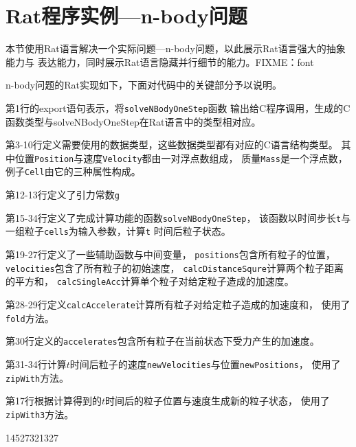 \section{Rat程序实例---n-body问题}\label{sec:n-body}
本节使用Rat语言解决一个实际问题---n-body问题，以此展示Rat语言强大的抽象能力与
表达能力，同时展示Rat语言隐藏并行细节的能力。FIXME：font
\begin{quotation}
\end{quotation}

n-body问题的Rat实现如下，下面对代码中的关键部分予以说明。
\begin{compactitem}
  \item 第1行的export语句表示，将\texttt{solveNBodyOneStep}函数
    输出给C程序调用，生成的C函数类型与solveNBodyOneStep在Rat语言中的类型相对应。
  \item 第3-10行定义需要使用的数据类型，这些数据类型都有对应的C语言结构类型。
    其中位置\texttt{Position}与速度\texttt{Velocity}都由一对浮点数组成，
    质量\texttt{Mass}是一个浮点数，例子\texttt{Cell}由它的三种属性构成。
  \item 第12-13行定义了引力常数\texttt{g}
  \item 第15-34行定义了完成计算功能的函数\texttt{solveNBodyOneStep}，
    该函数以时间步长\texttt{t}与一组粒子\texttt{cells}为输入参数，计算\texttt{t}
    时间后粒子状态。
    \begin{compactitem}
      \item 第19-27行定义了一些辅助函数与中间变量，
        \texttt{positions}包含所有粒子的位置，\texttt{velocities}包含了所有粒子的初始速度，
        \texttt{calcDistanceSqure}计算两个粒子距离的平方和，
        \texttt{calcSingleAcc}计算单个粒子对给定粒子造成的加速度。
      \item 第28-29行定义\texttt{calcAccelerate}计算所有粒子对给定粒子造成的加速度和，
        使用了\texttt{fold}方法。
      \item 第30行定义的\texttt{accelerates}包含所有粒子在当前状态下受力产生的加速度。
      \item 第31-34行计算$t$时间后粒子的速度\texttt{newVelocities}与位置\texttt{newPositions}，
        使用了\texttt{zipWith}方法。
      \item 第17行根据计算得到的$t$时间后的粒子位置与速度生成新的粒子状态，
        使用了\texttt{zipWith3}方法。
    \end{compactitem}
\end{compactitem}



14527321327

